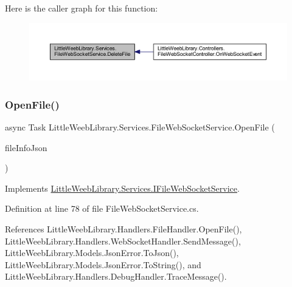 Here is the caller graph for this function\+:\nopagebreak
\begin{figure}[H]
\begin{center}
\leavevmode
\includegraphics[width=350pt]{class_little_weeb_library_1_1_services_1_1_file_web_socket_service_ab1375e8e82a50dfa06d91bebe988d133_icgraph}
\end{center}
\end{figure}
\mbox{\label{class_little_weeb_library_1_1_services_1_1_file_web_socket_service_ae140d076e6f64585e7b71bb51545e1bb}} 
\subsubsection{\texorpdfstring{Open\+File()}{OpenFile()}}
{\footnotesize\ttfamily async Task Little\+Weeb\+Library.\+Services.\+File\+Web\+Socket\+Service.\+Open\+File (\begin{DoxyParamCaption}\item[{J\+Object}]{file\+Info\+Json }\end{DoxyParamCaption})}



Implements \mbox{\hyperlink{interface_little_weeb_library_1_1_services_1_1_i_file_web_socket_service_a55cfbde72a70fb90c011438a1c415713}{Little\+Weeb\+Library.\+Services.\+I\+File\+Web\+Socket\+Service}}.



Definition at line 78 of file File\+Web\+Socket\+Service.\+cs.



References Little\+Weeb\+Library.\+Handlers.\+File\+Handler.\+Open\+File(), Little\+Weeb\+Library.\+Handlers.\+Web\+Socket\+Handler.\+Send\+Message(), Little\+Weeb\+Library.\+Models.\+Json\+Error.\+To\+Json(), Little\+Weeb\+Library.\+Models.\+Json\+Error.\+To\+String(), and Little\+Weeb\+Library.\+Handlers.\+Debug\+Handler.\+Trace\+Message().



